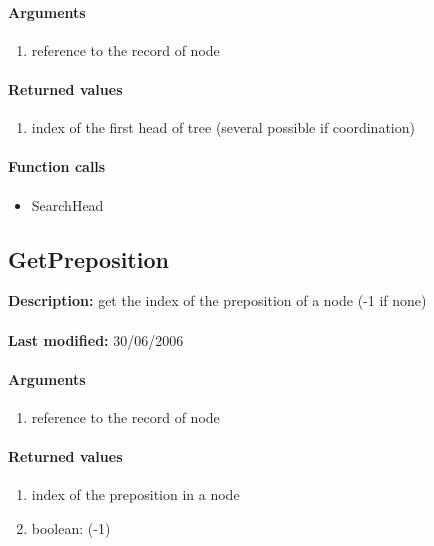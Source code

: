 \paragraph{Arguments}
\begin{enumerate}
\item reference to the record of node
\end{enumerate}

\paragraph{Returned values}
\begin{enumerate}
\item index of the first head of tree (several possible if coordination)
\end{enumerate}

\paragraph{Function calls}
\begin{itemize}
\item SearchHead
\end{itemize}

\subsection{GetPreposition}
\textbf{Description:} get the index of the preposition of a node (-1 if none)\\
\\\textbf{Last modified:} 30/06/2006

\paragraph{Arguments}
\begin{enumerate}
\item reference to the record of node
\end{enumerate}

\paragraph{Returned values}
\begin{enumerate}
\item index of the preposition in a node
\item boolean: (-1)
\end{enumerate}

